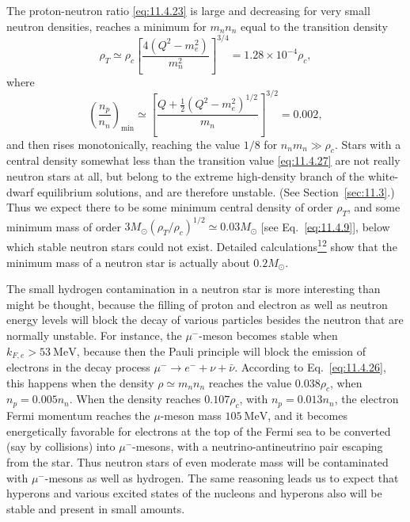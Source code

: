 The proton-neutron ratio \eqref{eq:11.4.23} is large and decreasing for very
small neutron densities, reaches a minimum for \(m_nn_n\) equal to the
transition density
\begin{equation}
  \rho_T
  \simeq
  \rho_c
  \left[\frac{4(Q^2-m_e^2)}{m_n^2}\right]^{3/4}
  =
  1.28\times10^{-4}\rho_c,
  \tag{11.4.27}\label{eq:11.4.27}
\end{equation}
where
\begin{equation}
  \left(\frac{n_p}{n_n}\right)_{\min}
  \simeq
  \left[
    \frac{Q+\tfrac12(Q^2-m_e^2)^{1/2}}{m_n}
  \right]^{3/2}
  =
  0.002,
  \tag{11.4.28}\label{eq:11.4.28}
\end{equation}
and then rises monotonically, reaching the value \(1/8\) for
\(n_nm_n\gg\rho_c\). Stars with a central density somewhat less than the
transition value \eqref{eq:11.4.27} are not really neutron stars at all, but
belong to the extreme high-density branch of the white-dwarf equilibrium
solutions, and are therefore unstable. (See Section~\ref{sec:11.3}.) Thus we
expect there to be some minimum central density of order \(\rho_T\), and some
minimum mass of order
\(3M_\odot(\rho_T/\rho_c)^{1/2}\simeq0.03M_\odot\) [see
Eq.~\eqref{eq:11.4.9}], below which stable neutron stars could not exist.
Detailed calculations\hyperref[ch11-ref-12]{\textsuperscript{12}} show that
the minimum mass of a neutron star is actually about \(0.2M_\odot\).

The small hydrogen contamination in a neutron star is more interesting than
might be thought, because the filling of proton and electron as well as neutron
energy levels will block the decay of various particles besides the neutron
that are normally unstable. For instance, the \(\mu^-\)-meson becomes stable
when \(k_{F,e}>53\ \mathrm{MeV}\), because then the Pauli principle will block
the emission of electrons in the decay process
\(\mu^-\to e^-+\nu+\bar\nu\). According to Eq.~\eqref{eq:11.4.26}, this
happens when the density \(\rho\simeq m_nn_n\) reaches the value
\(0.038\rho_c\), when \(n_p=0.005n_n\). When the density reaches
\(0.107\rho_c\), with \(n_p=0.013n_n\), the electron Fermi momentum reaches
the \(\mu\)-meson mass \(105\ \mathrm{MeV}\), and it becomes energetically
favorable for electrons at the top of the Fermi sea to be converted (say by
collisions) into \(\mu^-\)-mesons, with a neutrino-antineutrino pair escaping
from the star. Thus neutron stars of even moderate mass will be contaminated
with \(\mu^-\)-mesons as well as hydrogen. The same reasoning leads us to
expect that hyperons and various excited states of the nucleons and hyperons
also will be stable and present in small amounts.

